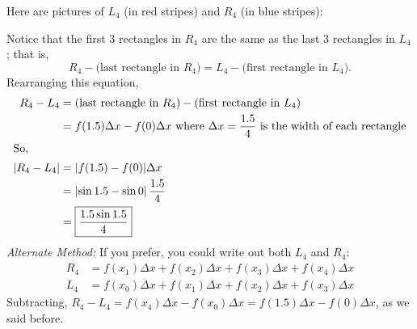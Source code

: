 \documentclass[main]{subfiles}
\begin{document}
\begin{enumerate}[resume]
{\begin{enumerate}
    \begin{solution}
      Here are pictures of $L_4$ (in red stripes) and $R_4$ (in blue
      stripes): 
      \begin{center}
      \end{center}
      Notice that the first 3 rectangles in $R_4$ are the same as the last
      3 rectangles in $L_4$; that is,
      \[ R_4 - \text{(last
        rectangle in $R_4$)} = L_4 - \text{(first rectangle in $L_4$)}.\]
      Rearranging this equation,
      \begin{align*}
        R_4 - L_4 &= \text{(last rectangle in $R_4$)} - \text{(first
          rectangle in $L_4$)} \\
        &= f(1.5) \Delta x - f(0) \Delta x \text{ where $\Delta x =
          \frac{1.5}{4}$ is the width of each rectangle} \\
        \shortintertext{So,}
        |R_4 - L_4| &= |f(1.5) - f(0)| \Delta x \\
        &= \left| \sin 1.5 - \sin 0 \right| \frac{1.5}{4} \\
        &= \boxed{\frac{1.5 \sin 1.5}{4}}
      \end{align*}
      \emph{Alternate Method:} If you prefer, you could write out both
      $L_4$ and $R_4$:
      \begin{align*}
        R_4 &= f(x_1) \Delta x + f(x_2) \Delta x + f(x_3) \Delta x +
        f(x_4) \Delta x \\
        L_4 &= f(x_0) \Delta x + f(x_1) \Delta x + f(x_2) \Delta x +
        f(x_3) \Delta x 
      \end{align*}
      Subtracting, $R_4 - L_4 = f(x_4) \Delta x - f(x_0) \Delta x = f(1.5)
      \Delta x - f(0) \Delta x$, as we said before.
    \end{solution}


\end{enumerate}}
\end{enumerate}
\end{document}
